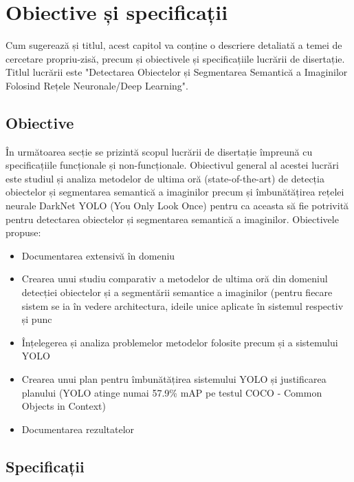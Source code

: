\chapter{Obiective și specificații}
\label{cap:obiective-specificatii}
Cum sugerează și titlul, acest capitol va conține o descriere detaliată a temei de cercetare propriu-zisă, precum și obiectivele și specificațiile lucrării de disertație. Titlul lucrării este "Detectarea Obiectelor și Segmentarea Semantică a Imaginilor Folosind Rețele Neuronale/Deep Learning".\newline

\section{Obiective}
În următoarea secție se prizintă scopul lucrării de disertație împreună cu specificațiile funcționale și non-funcționale.\newline
Obiectivul general al acestei lucrări este studiul și analiza metodelor de ultima oră (state-of-the-art) de detecția obiectelor și segmentarea semantică a imaginilor precum și îmbunătățirea rețelei neurale DarkNet YOLO  \cite{DBLP:journals/corr/abs-1804-02767} (You Only Look Once)  pentru ca aceasta să fie potrivită pentru detectarea obiectelor și segmentarea semantică a imaginilor. Obiectivele propuse:
\begin{itemize}
	\item Documentarea extensivă în domeniu
	\item Crearea unui studiu comparativ a metodelor de ultima oră din domeniul detecției obiectelor și a segmentării semantice a imaginilor (pentru fiecare sistem se ia în vedere architectura, ideile unice aplicate în sistemul respectiv și punc
	\item Înțelegerea și analiza problemelor metodelor folosite precum și a sistemului YOLO
	\item Crearea unui plan pentru îmbunătățirea sistemului YOLO și justificarea planului (YOLO atinge numai 57.9\% mAP pe testul COCO - Common Objects in Context)
	\item Documentarea rezultatelor
\end{itemize}

\section{Specificații}
